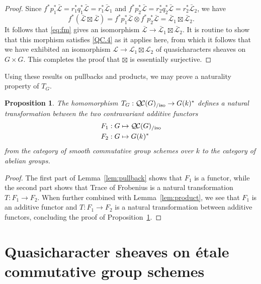 \documentclass[CM,Submssn,SecEq]{degruyter-crelle} %
\theoremstyle{plain}
\newtheorem{proposition}[theorem]{Proposition}
\theoremstyle{definition}
\theoremstyle{remark}
\newcommand{\Fq}{k}
\newcommand{\TrFrob}[1]{T_{#1}}
\newcommand{\qcs}[1]{{\mathcal{#1}}}
\newcommand{\gqcs}[1]{{\mathcal{\bar #1}}}
\newcommand{\QC}{{\mathcal{Q\hskip-0.8pt C}}}
\newcommand{\lQC}{{\QC_\text{flb}}}
\newcommand{\lQCiso}[1]{\lQC(#1)_{/\text{iso}}}
\newcommand{\QCiso}[1]{\QC(#1)_{/\text{iso}}}
\begin{document}
\begin{proof}
Since $f^*p_1^*\gqcs{L} = r_1^* q_1^* \gqcs{L} = r_1^* \gqcs{L}_1$ and $f^*p_2^*\gqcs{L} = r_2^* q_2^* \gqcs{L} = r_2^*\gqcs{L}_2$,
we have 
\[
f^*(\gqcs{L}\boxtimes \gqcs{L})  = f^*p_1^*\gqcs{L}\otimes f^* p_2^*\gqcs{L} = \gqcs{L}_1\boxtimes \gqcs{L}_2.
\]
It follows that \eqref{eq:fm} gives an isomorphism $\gqcs{L} \to  \gqcs{L}_1\boxtimes \gqcs{L}_2$.
It is routine to show that this morphism satisfies
\ref{QC.4} as it applies here,
from which it follows that we have exhibited an isomorphism
$\qcs{L} \to \qcs{L}_1\boxtimes \qcs{L}_2$ of quasicharacters sheaves on $G\times G$.
This completes the proof that $\boxtimes$ is essentially surjective.
\end{proof}

Using these results on pullbacks and products, we may prove a naturality property of $\TrFrob{G}$.

\begin{proposition}\label{prop:functorialG}
The homomorphism $\TrFrob{G} : \QCiso{G} \to G(\Fq)^*$ defines a natural transformation
between the two contravariant additive functors
\begin{align*}
F_1 : G &\mapsto \QCiso{G} \\
F_2 : G &\mapsto G(\Fq)^*
\end{align*}
from the category of smooth commutative group schemes over $\Fq$ to the category of abelian groups.
\end{proposition}

\begin{proof}
The first part of Lemma~\ref{lem:pullback} shows that $F_1$ is a functor,
while the second part shows that Trace of Frobenius is a natural transformation
$T: F_1 \to F_2$. When further combined with Lemma~\ref{lem:product},
we see that $F_1$ is an additive functor and $T: F_1 \to F_2$ is a natural
transformation between additive functors,
concluding the proof of Proposition~\ref{prop:functorialG}.
\end{proof}


\section{Quasicharacter sheaves on \'etale commutative group schemes} \label{sec:etale}
\end{document}
